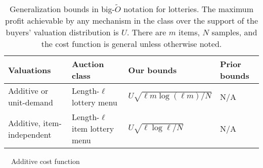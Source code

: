 \begin{table}
	\scriptsize
	\begin{tabularx}{\textwidth}{L{1} L{1} L{1} L{1}}
		\toprule
		Valuations & Auction class & Our bounds & Prior bounds\\\midrule
		Additive or unit-demand  & Length-$\ell$ lottery menu & $U\sqrt{\ell m \log (\ell m)/N}$ & N/A\\\midrule
		Additive, item-independent\footnotemark[1] &  Length-$\ell$ item lottery menu  &$U\sqrt{\ell \log \ell /N}$ & N/A\\\bottomrule
	\end{tabularx}
	\noindent\par
	{\center
		\scriptsize
		\footnotemark[1]~~{Additive cost function}
	}
	
	\caption{Generalization bounds in big-$\tilde O$ notation for lotteries. The maximum profit achievable by any mechanism in the class over the support of the buyers' valuation distribution is $U$. There are $m$ items, $N$ samples, and the cost function is general unless otherwise noted.}\label{tab:results_lotteries}
\end{table}

